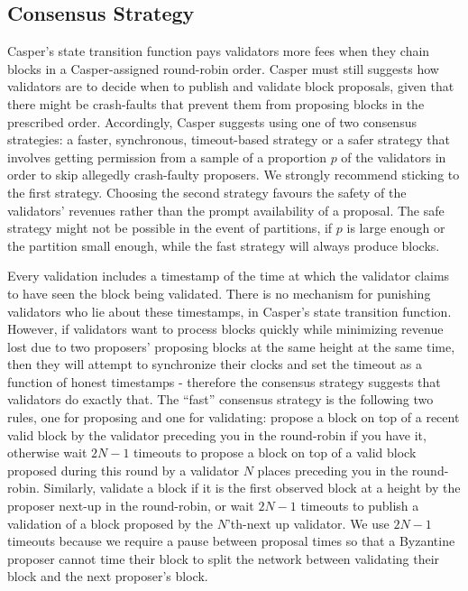 \documentclass[11pt,a4paper]{article}
\begin{document}
\subsection{Consensus Strategy}

Casper's state transition function pays validators more fees when they chain blocks in a Casper-assigned round-robin order. Casper must still suggests how validators are to decide when to publish and validate block proposals, given that there might be crash-faults that prevent them from proposing blocks in the prescribed order. Accordingly, Casper suggests using one of two consensus strategies: a faster, synchronous, timeout-based strategy or a safer strategy that involves getting permission from a sample of a proportion $p$ of the validators in order to skip allegedly crash-faulty proposers. We strongly recommend sticking to the first strategy. Choosing the second strategy favours the safety of the validators' revenues rather than the prompt availability of a proposal. The safe strategy might not be possible in the event of partitions, if $p$ is large enough or the partition small enough, while the fast strategy will always produce blocks.

Every validation includes a timestamp of the time at which the validator claims to have seen the block being validated. There is no mechanism for punishing validators who lie about these timestamps, in Casper's state transition function. However, if validators want to process blocks quickly while minimizing revenue lost due to two proposers' proposing blocks at the same height at the same time, then they will attempt to synchronize their clocks and set the timeout as a function of honest timestamps - therefore the consensus strategy suggests that validators do exactly that. The ``fast'' consensus strategy is the following two rules, one for proposing and one for validating: propose a block on top of a recent valid block by the validator preceding you in the round-robin if you have it, otherwise wait $2N - 1$ timeouts to propose a block on top of a valid block proposed during this round by a validator $N$ places preceding you in the round-robin. Similarly, validate a block if it is the first observed block at a height by the proposer next-up in the round-robin, or wait $2N - 1$ timeouts to publish a validation of a block proposed by the $N$'th-next up validator. We use $2N - 1$ timeouts because we require a pause between proposal times so that a Byzantine proposer cannot time their block to split the network between validating their block and the next proposer's block.
\end{document}
